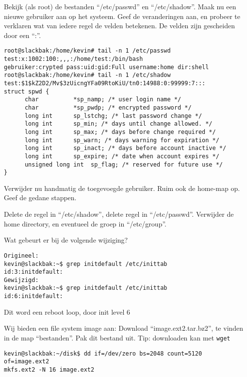 \question[15] Bekijk (als root) de bestanden ``/etc/passwd'' en ``/etc/shadow''. Maak nu een nieuwe gebruiker aan op het systeem. Geef de veranderingen aan, en probeer te verklaren wat van iedere regel de velden betekenen. De velden zijn gescheiden door een ``:''.
\begin{solution}
\begin{lstlisting}
root@slackbak:/home/kevin# tail -n 1 /etc/passwd
test:x:1002:100:,,,:/home/test:/bin/bash
gebruiker:crypted pass:uid:gid:Full username:home dir:shell
root@slackbak:/home/kevin# tail -n 1 /etc/shadow
test:$1$kZ2D2/Mv$3zUicngYFa09RtoKiU/tn0:14988:0:99999:7:::
struct spwd {
      char          *sp_namp; /* user login name */
      char          *sp_pwdp; /* encrypted password */
      long int      sp_lstchg; /* last password change */
      long int      sp_min; /* days until change allowed. */
      long int      sp_max; /* days before change required */
      long int      sp_warn; /* days warning for expiration */
      long int      sp_inact; /* days before account inactive */
      long int      sp_expire; /* date when account expires */
      unsigned long int  sp_flag; /* reserved for future use */
}
\end{lstlisting}%
\end{solution}

\question[5] Verwijder nu handmatig de toegevoegde gebruiker. Ruim ook de home-map op. Geef de gedane stappen.
\begin{solution}

Delete de regel in ``/etc/shadow'', delete regel in ``/etc/passwd''. Verwijder de home directory, en eventueel de groep in ``/etc/group''.
\end{solution}

\question[10] Wat gebeurt er bij de volgende wijziging?
\begin{lstlisting}
Origineel: 
kevin@slackbak:~$ grep initdefault /etc/inittab 
id:3:initdefault:
Gewijzigd:
kevin@slackbak:~$ grep initdefault /etc/inittab 
id:6:initdefault:
\end{lstlisting}
\begin{solution}

Dit word een reboot loop, door init level 6
\end{solution}

\question[0] Wij bieden een file system image aan:
Download ``image.ext2.tar.bz2'', te vinden in de map ``bestanden''. Pak dit bestand uit. Tip: downloaden kan met \texttt{wget}
\begin{solution}
\begin{lstlisting}
kevin@slackbak:~/disk$ dd if=/dev/zero bs=2048 count=5120 of=image.ext2
mkfs.ext2 -N 16 image.ext2
\end{lstlisting}%
\end{solution}

